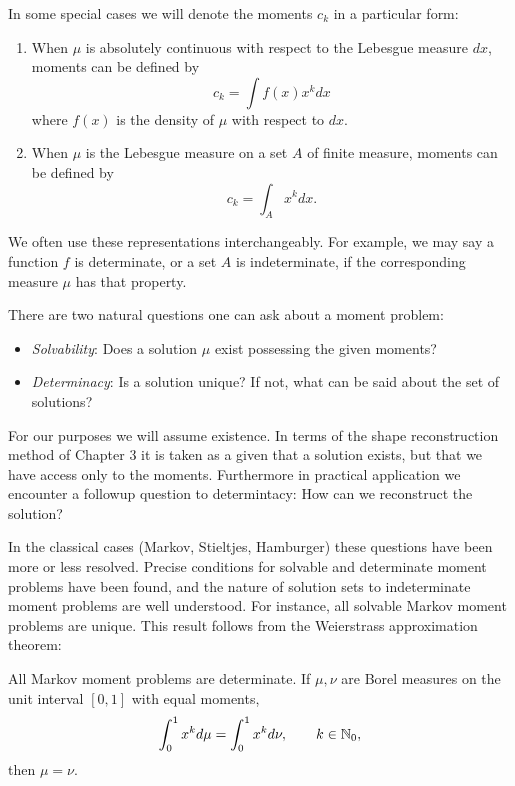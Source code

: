In some special cases we will denote the moments $c_k$ in a particular form:
\begin{enumerate}
  \item When $\mu$ is absolutely continuous with respect to the Lebesgue measure $dx$, moments can be defined by
  \[
    c_k = \int f(x)x^k dx
  \]
  where $f(x)$ is the density of $\mu$ with respect to $dx$.
  \item When $\mu$ is the Lebesgue measure on a set $A$ of finite measure, moments can be defined by
  \[
    c_k = \int_A x^k dx.
  \]
\end{enumerate}
We often use these representations interchangeably. For example, we may say a function $f$ is determinate, or a set $A$ is indeterminate, if the corresponding measure $\mu$ has that property.

There are two natural questions one can ask about a moment problem:
\begin{itemize}[label=]
  \item \emph{Solvability}: Does a solution $\mu$ exist possessing the given moments?
  \item \emph{Determinacy}: Is a solution unique? If not, what can be said about the set of solutions?
\end{itemize}

For our purposes we will assume existence. In terms of the shape reconstruction method of Chapter 3 it is taken as a given that a solution exists, but that we have access only to the moments. Furthermore in practical application we encounter a followup question to determintacy: How can we reconstruct the solution?

In the classical cases (Markov, Stieltjes, Hamburger) these questions have been more or less resolved. Precise conditions for solvable and determinate moment problems have been found, and the nature of solution sets to indeterminate moment problems are well understood. For instance, all solvable Markov moment problems are unique. This result follows from the Weierstrass approximation theorem:

\begin{proposition}
  All Markov moment problems are determinate. If $\mu, \nu$ are Borel measures on the unit interval $[0,1]$ with equal moments,
  \[
    \int_0^1 x^k d\mu = \int_0^1 x^k d\nu, \qquad k \in \mathbb{N}_0,
  \]
  then $\mu = \nu$.
\end{proposition}


